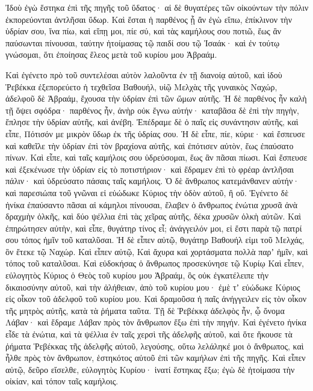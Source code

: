 {Ἰδοὺ ἐγὼ ἕστηκα ἐπὶ τῆς πηγῆς τοῦ ὕδατος· αἱ δὲ θυγατέρες τῶν οἰκούντων τὴν πόλιν ἐκπορεύονται ἀντλῆσαι ὕδωρ.
Καὶ ἔσται ἡ παρθένος ᾗ ἂν ἐγὼ εἴπω, ἐπίκλινον τὴν ὑδρίαν σου, ἵνα πίω, καὶ εἴπῃ μοι, πίε σύ, καὶ τὰς καμήλους σου ποτιῶ, ἕως ἂν παύσωνται πίνουσαι, ταύτην ἡτοίμασας τῷ παιδί σου τῷ Ἰσαάκ· καὶ ἐν τούτῳ γνώσομαι, ὅτι ἐποίησας ἔλεος μετὰ τοῦ κυρίου μου Ἁβραάμ.
\par }{\PP {}Καὶ ἐγένετο πρὸ τοῦ συντελέσαι αὐτὸν λαλοῦντα ἐν τῇ διανοίᾳ αὐτοῦ, καὶ ἰδοὺ Ῥεβέκκα ἐξεπορεύετο ἡ τεχθεῖσα Βαθουήλ, υἱῷ Μελχὰς τῆς γυναικὸς Ναχώρ, ἀδελφοῦ δὲ Ἁβραάμ, ἔχουσα τὴν ὑδρίαν ἐπὶ τῶν ὤμων αὐτῆς.
Ἡ δὲ παρθένος ἦν καλὴ τῇ ὄψει σφόδρα· παρθένος ἦν, ἀνὴρ οὐκ ἔγνω αὐτήν· καταβᾶσα δὲ ἐπὶ τὴν πηγὴν, ἔπλησε τὴν ὑδρίαν αὐτῆς, καὶ ἀνέβη.
Ἐπέδραμε δὲ ὁ παῖς εἰς συνάντησιν αὐτῆς, καὶ εἶπε, Πότισόν με μικρὸν ὕδωρ ἐκ τῆς ὑδρίας σου.
Ἡ δὲ εἶπε, πίε, κύριε· καὶ ἔσπευσε καὶ καθεῖλε τὴν ὑδρίαν ἐπὶ τὸν βραχίονα αὐτῆς, καὶ ἐπότισεν αὐτὸν, ἕως ἐπαύσατο πίνων.
Καὶ εἶπε, καὶ ταῖς καμήλοις σου ὑδρεύσομαι, ἕως ἂν πᾶσαι πίωσι.
Καὶ ἔσπευσε καὶ ἐξεκένωσε τὴν ὑδρίαν εἰς τὸ ποτιστήριον· καὶ ἔδραμεν ἐπὶ τὸ φρέαρ ἀντλῆσαι πάλιν· καὶ ὑδρεύσατο πάσαις ταῖς καμήλοις.
Ὁ δὲ ἄνθρωπος κατεμάνθανεν αὐτήν· καὶ παρεσιώπα τοῦ γνῶναι εἰ εὐώδωκε Κύριος τὴν ὁδὸν αὐτοῦ, ἢ οὔ.
Ἐγένετο δὲ ἡνίκα ἐπαύσαντο πᾶσαι αἱ κάμηλοι πίνουσαι, ἔλαβεν ὁ ἄνθρωπος ἐνώτια χρυσᾶ ἀνὰ δραχμὴν ὁλκῆς, καὶ δύο ψέλλια ἐπὶ τὰς χεῖρας αὐτῆς, δέκα χρυσῶν ὁλκὴ αὐτῶν.
Καὶ ἐπηρώτησεν αὐτὴν, καὶ εἶπε, θυγάτηρ τίνος εἶ; ἀνάγγειλόν μοι, εἰ ἔστι παρὰ τῷ πατρί σου τόπος ἡμῖν τοῦ καταλῦσαι.
Ἡ δὲ εἶπεν αὐτῷ, θυγάτηρ Βαθουήλ εἰμι τοῦ Μελχάς, ὃν ἔτεκε τῷ Ναχώρ.
Καὶ εἶπεν αὐτῷ, Καὶ ἄχυρα καὶ χορτάσματα πολλὰ παρʼ ἡμῖν, καὶ τόπος τοῦ καταλῦσαι.
Καὶ εὐδοκήσας ὁ ἄνθρωπος προσεκύνησε τῷ Κυρίῳ
Καὶ εἶπεν, εὐλογητὸς Κύριος ὁ Θεὸς τοῦ κυρίου μου Ἁβραάμ, ὃς οὐκ ἐγκατέλειπε τὴν δικαιοσύνην αὐτοῦ, καὶ τὴν ἀλήθειαν, ἀπὸ τοῦ κυρίου μου· ἐμὲ τʼ εὐώδωκε Κύριος εἰς οἶκον τοῦ ἀδελφοῦ τοῦ κυρίου μου.
Καὶ δραμοῦσα ἡ παῖς ἀνήγγειλεν εἰς τὸν οἶκον τῆς μητρὸς αὐτῆς, κατὰ τὰ ῥήματα ταῦτα.
Τῇ δὲ Ῥεβέκκᾳ ἀδελφὸς ἦν, ᾧ ὄνομα Λάβαν· καὶ ἔδραμε Λάβαν πρὸς τὸν ἄνθρωπον ἔξω ἐπὶ τὴν πηγήν.
Καὶ ἐγένετο ἡνίκα εἶδε τὰ ἐνώτια, καὶ τὰ ψέλλια ἐν ταῖς χερσὶ τῆς ἀδελφῆς αὐτοῦ, καὶ ὅτε ἤκουσε τὰ ῥήματα Ῥεβέκκας τῆς ἀδελφῆς αὐτοῦ, λεγούσης, οὕτω λελάληκέ μοι ὁ ἄνθρωπος, καὶ ἦλθε πρὸς τὸν ἄνθρωπον, ἑστηκότος αὐτοῦ ἐπὶ τῶν καμήλων ἐπὶ τῆς πηγῆς.
Καὶ εἶπεν αὐτῷ, δεῦρο εἴσελθε, εὐλογητὸς Κυρίου· ἱνατί ἕστηκας ἔξω; ἐγὼ δὲ ἡτοίμασα τὴν οἰκίαν, καὶ τόπον ταῖς καμήλοις.
}

